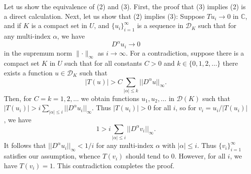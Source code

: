 \documentclass[12pt]{article}
\newcommand{\sC}[0]{\mathbb{C}}
\begin{document}
\newcommand{\cD}[0]{\mathcal{D}}
\newcommand{\scomp}[0]{C^\infty_0}
Let us show the equivalence of (2) and (3).
First, the proof  that (3) implies (2) is a direct calculation. 
Next, let us show that (2) implies (3): 
Suppose $Tu_i \to 0$ in $\sC$, and if $K$ is a  compact set in $U$, and  
$\{u_i\}_{i=1}^\infty$ is a sequence in $\cD_K$ such that
for any multi-index $\alpha$, we have 
$$ D^\alpha u_i \to 0$$
in the supremum norm $\lVert\cdot\rVert_\infty$ as $i\to \infty$.
For a contradiction, suppose there is a compact set $K$ in $U$
such that for all constants $C>0$ and $k\in\{0, 1,2,\ldots\}$ there exists 
a function $u\in \cD_K$ such that 
$$|T(u)|> C\sum_{|\alpha|\le k} ||D^\alpha u||_\infty.$$
Then, for $C=k=1,2,\ldots$ we obtain functions $u_1,u_2,\ldots$ in $\cD(K)$
such that 
$ |T(u_i)| > i\sum_{|\alpha|\le i} ||D^\alpha u_i||_\infty.$
Thus $|T(u_i)|>0$ for all $i$, so for $v_i=u_i/|T(u_i)|$, we have
$$ 1> i\sum_{|\alpha|\le i} ||D^\alpha v_i||_\infty.$$
It follows that $||D^\alpha u_i||_\infty< 1/i$ 
for any multi-index $\alpha$ with $|\alpha|\le i$.
Thus $\{v_i\}_{i=1}^\infty$ satisfies our assumption, whence $T(v_i)$ should tend to $0$. 
However, for all $i$, we have $T(v_i)= 1$. This contradiction 
completes the proof.
\end{document}

